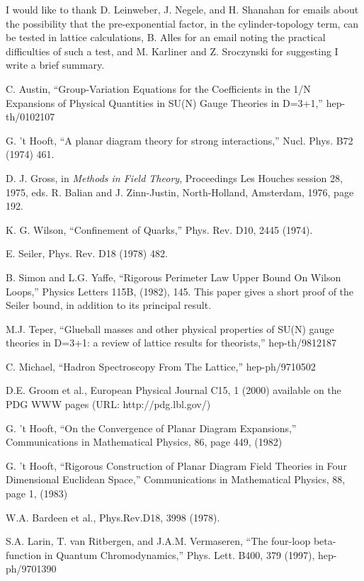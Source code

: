 \documentclass[a4paper,12pt,oneside]{article}
\begin{document}
\vspace{0.5cm}

I would like to thank D. Leinweber, J. Negele, and H. Shanahan for 
emails about the possibility that the pre-exponential factor, in the 
cylinder-topology term, can be tested in lattice calculations, B. Alles 
for an email noting the practical difficulties of such a test, and M. 
Karliner and Z. Sroczynski for suggesting I write a brief summary.

\begin{thebibliography}{99}

C. Austin, ``Group-Variation Equations for the Coefficients in the 1/N
Expansions of Physical Quantities in SU(N) Gauge Theories in D=3+1,''
hep-th/0102107

G. 't Hooft, ``A planar diagram theory for strong interactions,'' Nucl. Phys. B72 (1974) 461.

D. J. Gross, in \textit{Methods in Field Theory}, Proceedings Les 
Houches session 28, 1975, eds. R. Balian and J. Zinn-Justin, 
North-Holland, Amsterdam, 1976, page 192.

K. G. Wilson, ``Confinement of Quarks,'' Phys. Rev. D10, 2445 (1974).

E. Seiler, Phys. Rev. D18 (1978) 482.

B. Simon and L.G. Yaffe, ``Rigorous Perimeter Law Upper Bound On Wilson
Loops,'' Physics Letters 115B, (1982), 145.  This paper gives a short
proof of the Seiler bound, in addition to its principal result.

M.J. Teper, ``Glueball masses and other physical properties of SU(N) 
gauge theories in D=3+1: a review of lattice results for theorists,'' 
hep-th/9812187

C. Michael, ``Hadron Spectroscopy From The Lattice,'' hep-ph/9710502

D.E. Groom et al., European Physical Journal C15, 1 (2000)
available on the PDG WWW pages (URL: http://pdg.lbl.gov/)

G. 't Hooft, ``On the Convergence of Planar Diagram Expansions,'' 
Communications in Mathematical Physics, 86, page 449, (1982)

G. 't Hooft, ``Rigorous Construction of Planar Diagram Field Theories in 
Four Dimensional Euclidean Space,'' Communications in Mathematical 
Physics, 88, page 1, (1983)

W.A. Bardeen et al., Phys.Rev.D18, 3998 (1978).

S.A. Larin, T. van Ritbergen, and J.A.M. Vermaseren, ``The four-loop 
beta-function in Quantum Chromodynamics,'' Phys. Lett. B400, 379 (1997), 
hep-ph/9701390

\end{thebibliography}
\end{document}
